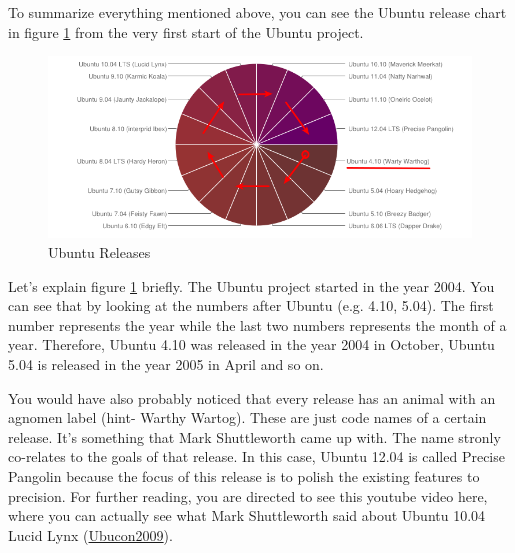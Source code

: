 \par \noindent To summarize everything mentioned above, you can see the Ubuntu release chart in figure \ref{fig:ubuntu-releases} from the very first start of the Ubuntu project. \\

\begin{figure}[h]	
	\begin{center}
	\includegraphics[width=400pt]{./images/about-ubuntu/ubuntu-releases.png}
	\caption{Ubuntu Releases}	
	\label{fig:ubuntu-releases}	
	\end{center}
\end{figure}

\par \noindent Let's explain figure \ref{fig:ubuntu-releases} briefly. The Ubuntu project started in the year 2004. You can see that by looking at the numbers after Ubuntu (e.g. 4.10, 5.04). The first number represents the year while the last two numbers represents the month of a year. Therefore, Ubuntu 4.10 was released in the year 2004 in October, Ubuntu 5.04 is released in the year 2005 in April and so on. \\

\par \noindent You would have also probably noticed that every release has an animal with an agnomen label (hint- Warthy Wartog). These are just code names of a certain release. It's something that Mark Shuttleworth came up with. The name stronly co-relates to the goals of that release. In this case, Ubuntu 12.04 is called Precise Pangolin because the focus of this release is to polish the existing features to precision. For further reading, you are directed to see this youtube video here, where you can actually see what Mark Shuttleworth said about Ubuntu 10.04 Lucid Lynx (\href{http://www.youtube.com/watch?v=l02bhwofEqw}{Ubucon2009}). \\

